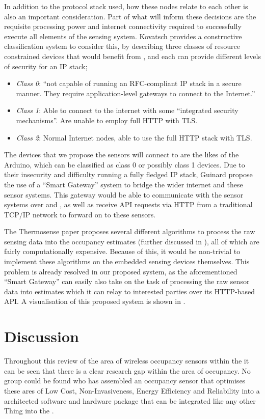 \documentclass[../thesis/thesis.tex]{subfiles}
\begin{document}
In addition to the protocol stack used, how these nodes relate to each other is also an important consideration. Part of what will inform these decisions are the requisite processing power and internet connectivity required to successfully execute all elements of the sensing system. Kovatsch \cite{kovatsch2013coap} provides a constructive classification system to consider this, by describing three classes of resource constrained devices that would benefit from \coap, and each can provide different levels of security for an IP stack;

\begin{itemize}
 \item \emph{Class 0}: ``not capable of running an RFC-compliant IP stack in a secure manner. They require application-level gateways to connect to the Internet.''
 \item \emph{Class 1}: Able to connect to the internet with some ``integrated security mechanisms''. Are unable to employ full HTTP with TLS.
 \item \emph{Class 2}: Normal Internet nodes, able to use the full HTTP stack with TLS.
\end{itemize}

The devices that we propose the sensors will connect to are the likes of the Arduino, which can be classified as class 0 or possibly class 1 devices. Due to their insecurity and difficulty running a fully fledged IP stack, Guinard \etal \cite{guinard2011internet} propose the use of a ``Smart Gateway'' system to bridge the wider internet and these sensor systems. This gateway would be able to communicate with the sensor systems over \coap and \lwifi, as well as receive API requests via HTTP from a traditional TCP/IP network to forward on to these sensors.

The Thermosense paper \cite{beltran2013thermosense} proposes several different algorithms to process the raw sensing data into the occupancy estimates (further discussed in ), all of which are fairly computationally expensive. Because of this, it would be non-trivial to implement these algorithms on the embedded sensing devices themselves. This problem is already resolved in our proposed system, as the aforementioned ``Smart Gateway'' can easily also take on the task of processing the raw sensor data into estimates which it can relay to interested parties over its HTTP-based API. A visualisation of this proposed system is shown in .

\section{Discussion}
\label{sec:litreview:discussion}
Throughout this review of the area of wireless occupancy sensors within the \iot it can be seen that there is a clear research gap within the area of occupancy. No group could be found who has assembled an occupancy sensor that optimises these ares of Low Cost, Non-Invasiveness, Energy Efficiency and Reliability into a architected software and hardware package that can be integrated like any other Thing into the \iot.
\end{document}
